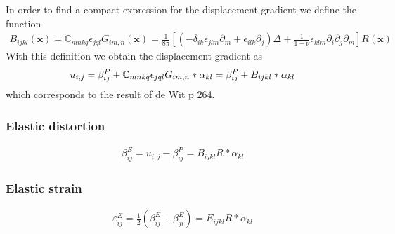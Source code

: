 In order to find a compact expression for the displacement gradient we define the function
\begin{align}
B_{ijkl}(\bm x)=\mathbb{C}_{mnkq}\epsilon_{jql}G_{im,n}(\bm x)
=\frac{1}{8\pi}\left[\left(-\delta_{ik}\epsilon_{jlm}\partial_m+\epsilon_{ilk}\partial_j\right)\Delta+\frac{1}{1-\nu}\epsilon_{klm}\partial_i\partial_j\partial_m\right] R(\bm x)
\end{align}
With this definition we obtain the displacement gradient as
\begin{align}
u_{i,j}=\beta^{P}_{ij}+\mathbb{C}_{mnkq}\epsilon_{jql}G_{im,n}*\alpha_{kl}=\beta^P_{ij}+B_{ijkl}*\alpha_{kl}
\end{align}
which corresponds to the result of  de Wit p 264.

\subsubsection{Elastic distortion}
\begin{align}
\beta^E_{ij}=u_{i,j}-\beta^P_{ij}=B_{ijkl}R*\alpha_{kl}
\end{align}

\subsubsection{Elastic strain}
\begin{align}
\varepsilon^E_{ij}=\frac{1}{2}\left(\beta^E_{ij}+\beta^E_{ji}\right)=E_{ijkl}R*\alpha_{kl}
\end{align}

